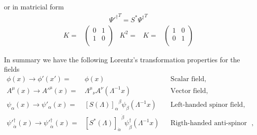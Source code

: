 or in matricial form
\begin{align}
{{\Psi'}^{\dagger}}^{T}=S^{*}{{\Psi}^{\dagger}}^{T}
\end{align}
\begin{align}
  K=&\begin{pmatrix}
    0 & 1\\
    1 & 0\\
  \end{pmatrix}& K^2=&  K=&\begin{pmatrix}
    1 & 0\\
    0 & 1\\
  \end{pmatrix}
\end{align}

\begin{frame}
In summary we have the following Lorentz's transformation properties for the fields
\begin{align}
   \phi(x)\to \phi'(x')=&\phi(x) && \text{Scalar field,}\nonumber\\
   A^\mu(x)\to {A'}^\mu(x)=&{\Lambda^\mu}_\nu A^\nu(\Lambda^{-1}x)&&\text{Vector field,}\nonumber\\
  \psi_\alpha(x)\to\psi'_\alpha(x)=&{\left[ S(\Lambda) \right]_\alpha}^\beta\psi_\beta(\Lambda^{-1}x)
&& \text{Left-handed spinor field,}\nonumber\\
 {\psi'}_{\dot{\alpha}}^{\dagger}(x)\to  {\psi'}_{\dot{\alpha}}^{\dagger}(x)=&{\left[ S^*(\Lambda)\right]_{\dot{\alpha}}}^{\dot{\beta}} \psi_{\dot{\beta}}^{\dagger}(\Lambda^{-1}x)&& \text{Rigth-handed anti-spinor field,}\,,
 \end{align}
\end{frame}



